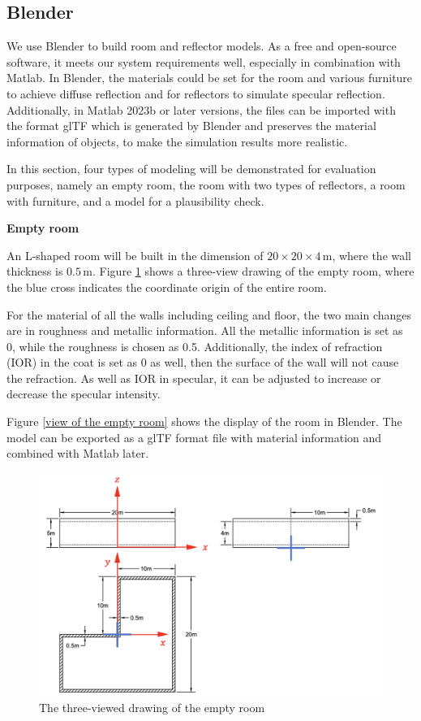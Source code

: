 \documentclass[12pt,DIV14,BCOR12mm,a4paper,footinclude=false,headinclude,parskip=half-,twoside,openright,cleardoublepage=empty,toc=index,bibliography=totoc,listof=totoc]{scrreprt}
\numberwithin{equation}{chapter}
\begin{document}
\subsection{Blender} \label{Blender}
We use Blender \cite{blender} to build room and reflector models. As a free and open-source software, it meets our system requirements well, especially in combination with Matlab. In Blender, the materials could be set for the room and various furniture to achieve diffuse reflection and for reflectors to simulate specular reflection. Additionally, in Matlab 2023b or later versions, the files can be imported with the format glTF which is generated by Blender and preserves the material information of objects, to make the simulation results more realistic.

In this section, four types of modeling will be demonstrated for evaluation purposes, namely an empty room, the room with two types of reflectors, a room with furniture, and a model for a plausibility check.

\begin{spacing}{1.5}
\textbf{\large{Empty room}}
\end{spacing}
An L-shaped room will be built in the dimension of $20\times 20\times 4\,\mathrm{m}$, where the wall thickness is $0.5\,\mathrm{m}$. Figure \ref{empty room three-view} shows a three-view drawing of the empty room, where the blue cross indicates the coordinate origin of the entire room.

For the material of all the walls including ceiling and floor, the two main changes are in roughness and metallic information. All the metallic information is set as 0, while the roughness is chosen as 0.5. Additionally, the index of refraction (IOR) in the coat is set as 0 as well, then the surface of the wall will not cause the refraction. As well as IOR in specular, it can be adjusted to increase or decrease the specular intensity.

Figure \ref{view of the empty room} shows the display of the room in Blender. The model can be exported as a glTF format file with material information and combined with Matlab later.

\begin{figure}[t]
	\centering
	\includegraphics[scale=.45]{figures/empty_room_three_view.png}
	\caption{The three-viewed drawing of the empty room}
	\label{empty room three-view}
\end{figure}
\end{document}
